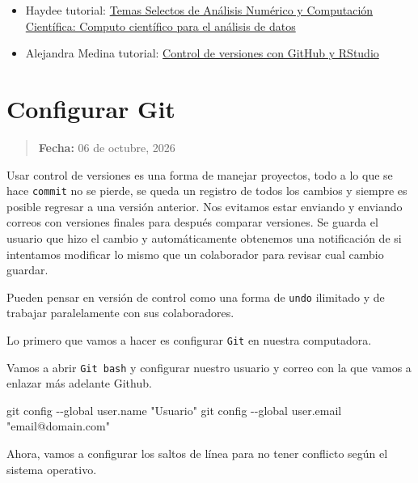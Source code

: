 \documentclass[
  spanish,
  12pt,
  letterpaper,
  DIV=11,
  numbers=noendperiod]{scrreprt}
\newenvironment{Shaded}{\begin{snugshade}}{\end{snugshade}}
\newcommand{\AttributeTok}[1]{\textcolor[rgb]{0.40,0.45,0.13}{#1}}
\newcommand{\FunctionTok}[1]{\textcolor[rgb]{0.28,0.35,0.67}{#1}}
\newcommand{\NormalTok}[1]{\textcolor[rgb]{0.00,0.23,0.31}{#1}}
\newcommand{\StringTok}[1]{\textcolor[rgb]{0.13,0.47,0.30}{#1}}
\providecommand{\tightlist}{%
  \setlength{\itemsep}{0pt}\setlength{\parskip}{0pt}}
\begin{document}
\begin{itemize}
\tightlist
\item
  Haydee tutorial:
  \href{https://haydeeperuyero.github.io/Computo_Cientifico/}{Temas
  Selectos de Análisis Numérico y Computación Científica: Computo
  científico para el análisis de datos}
\item
  Alejandra Medina tutorial:
  \href{https://comunidadbioinfo.github.io/cdsb2023/control-de-versiones-con-github-y-rstudio.html}{Control
  de versiones con GitHub y RStudio}
\end{itemize}

\chapter{Configurar Git}\label{configurar-git}

\begin{quote}
\textbf{Fecha:} 06 de octubre, 2026
\end{quote}

Usar control de versiones es una forma de manejar proyectos, todo a lo
que se hace \texttt{commit} no se pierde, se queda un registro de todos
los cambios y siempre es posible regresar a una versión anterior. Nos
evitamos estar enviando y enviando correos con versiones finales para
después comparar versiones. Se guarda el usuario que hizo el cambio y
automáticamente obtenemos una notificación de si intentamos modificar lo
mismo que un colaborador para revisar cual cambio guardar.

Pueden pensar en versión de control como una forma de \texttt{undo}
ilimitado y de trabajar paralelamente con sus colaboradores.

Lo primero que vamos a hacer es configurar \texttt{Git} en nuestra
computadora.

Vamos a abrir \texttt{Git\ bash} y configurar nuestro usuario y correo
con la que vamos a enlazar más adelante Github.

\begin{Shaded}
\begin{Highlighting}[]
\FunctionTok{git}\NormalTok{ config }\AttributeTok{{-}{-}global}\NormalTok{ user.name }\StringTok{"Usuario"}
\FunctionTok{git}\NormalTok{ config }\AttributeTok{{-}{-}global}\NormalTok{ user.email }\StringTok{"email@domain.com"}
\end{Highlighting}
\end{Shaded}

Ahora, vamos a configurar los saltos de línea para no tener conflicto
según el sistema operativo.
\end{document}
